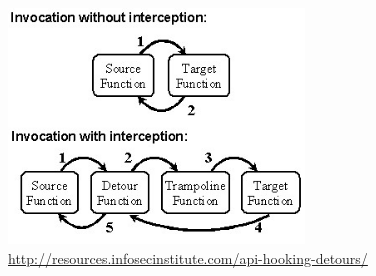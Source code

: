 \begin{figure}[ht]
	\centering
	\includegraphics[width=0.7\textwidth]{sections/background/attacks/fig_detours.png}
	\caption{\url{http://resources.infosecinstitute.com/api-hooking-detours/}}
	\label{fig_detours}
\end{figure}


